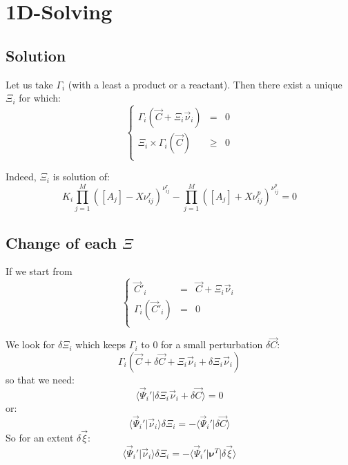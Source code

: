 \documentclass[aps,12pt]{revtex4}
\begin{document}
\section{1D-Solving}

\subsection{Solution}

Let us take $\Gamma_i$ (with a least a product or a reactant).
Then there exist a unique $\Xi_i$ for which:
\begin{equation}
\left\lbrace
\begin{array}{rcl}
	\Gamma_i(\vec{C} + \Xi_i \vec{\nu}_i ) & = & 0\\
	 \Xi_i \times \Gamma_i(\vec{C}) &\geq  &0\\
\end{array}
\right.
\end{equation}
 
Indeed, $\Xi_i$ is solution of:
\begin{equation}
	  K_i \prod_{j=1}^{M} \left([A_j] - X \nu^r_{ij}\right)^{\nu^r_{ij}} 
	- \prod_{j=1}^{M} \left([A_j] + X \nu^p_{ij} \right)^{\nu^p_{ij}} = 0
\end{equation} 

\subsection{Change of each $\Xi$}
If we start from
\begin{equation}
\left\lbrace
\begin{array}{rcl}
	\vec{C}'_i & = & \vec{C} + \Xi_i \vec{\nu}_i\\
	\Gamma_i(\vec{C}'_i) & = & 0\\
\end{array}
\right.
\end{equation}

We look for $\delta \Xi_i$ which keeps $\Gamma_i$ to $0$ for a small perturbation $\delta\vec{C}$:
\begin{equation}
	\Gamma_i\left( \vec{C} + \delta\vec{C} + \Xi_i \vec{\nu}_i + \delta \Xi_i \vec{\nu}_i \right)
\end{equation}
so that we need:
\begin{equation}
	\langle \vec{\Psi}_i' \vert  \delta \Xi_i \vec{\nu}_i + \delta\vec{C} \rangle = 0
\end{equation}
or:
\begin{equation}
	\langle \vec{\Psi}_i' \vert  \vec{\nu}_i  \rangle  \delta \Xi_i = - \langle \vec{\Psi}_i' \vert \delta\vec{C} \rangle 
 \end{equation}
So for an extent $\delta\vec{\xi}$:
\begin{equation}
	\langle \vec{\Psi}_i' \vert  \vec{\nu}_i  \rangle  \delta \Xi_i = - \langle \vec{\Psi}_i' \vert \bm{\nu}^T \vert \delta\vec{\xi} \rangle 
\end{equation}
\end{document}
